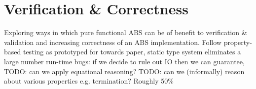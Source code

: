 \chapter{Verification \& Correctness}
Exploring ways in which pure functional ABS can be of benefit to verification \& validation and increasing correctness of an ABS implementation. Follow property-based testing as prototyped for towards paper, static type system eliminates a large number run-time bugs: if we decide to rule out IO then we can guarantee, TODO: can we apply equational reasoning? TODO: can we (informally) reason about various properties e.g. termination?
Roughly 50\%
